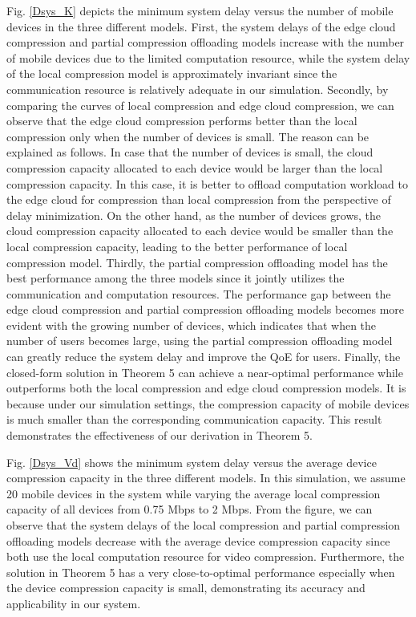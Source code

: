 \documentclass[journal,draftcls,onecolumn,12pt,twoside]{IEEEtran}
\begin{document}
Fig. \ref{Dsys_K} depicts the minimum system delay versus the number of mobile devices in the three different models. First, the system delays of the edge cloud compression and partial compression offloading models increase with the number of mobile devices due to the limited computation resource, while the system delay of the local compression model is approximately invariant since the communication resource is relatively adequate in our simulation. Secondly, by comparing the curves of local compression and edge cloud compression, we can observe that the edge cloud compression performs better than the local compression only when the number of devices is small. The reason can be explained as follows. In case that the number of devices is small, the cloud compression capacity allocated to each device would be larger than the local compression capacity. In this case, it is better to offload computation workload to the edge cloud for compression than local compression from the perspective of delay minimization. On the other hand, as the number of devices grows, the cloud compression capacity allocated to each device would be smaller than the local compression capacity, leading to the better performance of local compression model. Thirdly, the partial compression offloading model has the best performance among the three models since it jointly utilizes the communication and computation resources. The performance gap between the edge cloud compression and partial compression offloading models becomes more evident with the growing number of devices, which indicates that when the number of users becomes large, using the partial compression offloading model can greatly reduce the system delay and improve the QoE for users. Finally, the closed-form solution in Theorem 5 can achieve a near-optimal performance while outperforms both the local compression and edge cloud compression models. It is because under our simulation settings, the compression capacity of mobile devices is much smaller than the corresponding communication capacity. This result demonstrates the effectiveness of our derivation in Theorem 5.

Fig. \ref{Dsys_Vd} shows the minimum system delay versus the average device compression capacity in the three different models. In this simulation, we assume 20 mobile devices in the system while varying the average local compression capacity of all devices from 0.75 Mbps to 2 Mbps. From the figure, we can observe that the system delays of the local compression and partial compression offloading models decrease with the average device compression capacity since both use the local computation resource for video compression. Furthermore, the solution in Theorem 5 has a very close-to-optimal performance especially when the device compression capacity is small, demonstrating its accuracy and applicability in our system.
\end{document}
